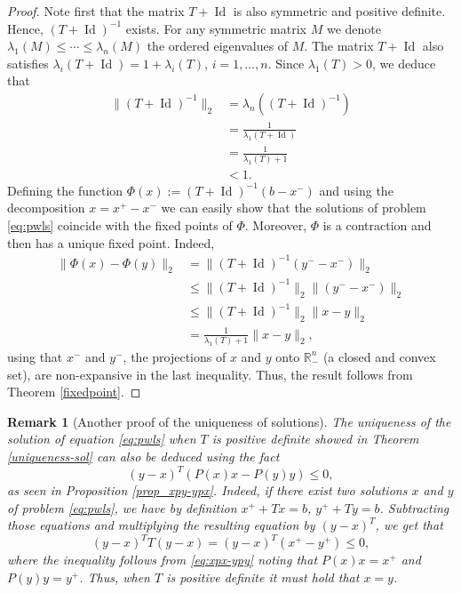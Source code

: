 \documentclass[11pt]{article}
\newtheorem{remark}{Remark}
\DeclareMathOperator{\Id}{Id}
\newcommand{\R}{\mathbb R}
\begin{document}
\begin{proof}

Note first that the matrix $T + {\Id}$ is also symmetric and positive definite. Hence, $(T + {\Id})^{-1}$ exists. For any symmetric matrix $M$ we denote $\lambda_1(M) \leq \cdots \leq \lambda_n(M)$ the ordered eigenvalues of $M$. The matrix $T + {\Id}$ also satisfies $\lambda_i(T + {\Id}) = 1 + \lambda_i(T)$, $i=1,\dots,n$.
Since $\lambda_{1}(T)> 0$, we deduce that
\begin{align*}
\|(T + {\Id})^{-1}\|_2 &= \lambda_{n}((T + {\Id})^{-1}) \\
&= \frac{1}{\lambda_{1}(T + {\Id})} \\
&= \frac{1}{\lambda_{1}(T) + 1} \\
&< 1.
\end{align*} Defining the function $\Phi(x) := (T + {\Id})^{-1}(b-x^-)$ and using the decomposition $x = x^+ - x^-$ we can easily show that the solutions of problem \eqref{eq:pwls} coincide with the fixed points of $\Phi$. Moreover, $\Phi$ is a contraction and then has a unique fixed point. Indeed,
\begin{align*}
\| \Phi(x) - \Phi(y) \|_2 &= \|(T + {\Id})^{-1}(y^--x^-)\|_2 \\
&\leq \|(T + {\Id})^{-1}\|_2 \|(y^--x^-)\|_2 \\
&\leq \|(T +{\Id})^{-1}\|_2 \|x-y\|_2 \\
&=\frac{1}{\lambda_{1}(T) + 1} \|x-y\|_2,
\end{align*} 
using that $x^-$ and $y^-$, the projections of $x$ and $y$ onto $\R^n_{-}$ (a closed and convex set), are non-expansive in the last inequality. Thus, the result follows from Theorem \ref{fixedpoint}.\end{proof}
\begin{remark}[Another proof of the uniqueness of solutions]
The uniqueness of the solution of equation \eqref{eq:pwls} when $T$ is positive definite showed in Theorem \ref{uniqueness-sol} can also be deduced using the fact
\begin{equation} \label{eq:xpx-ypy}
(y-x)^T (P(x)x-P(y)y) \leq 0,
\end{equation}
as seen in Proposition \ref{prop_xpy-ypx}. Indeed, if there exist two solutions $x$ and $y$ of problem \eqref{eq:pwls}, we have by definition $x^++Tx = b$, 
$y^++Ty = b$. Subtracting those equations and multiplying the resulting equation by $(y-x)^T$, we get that
$$ (y-x)^T T(y-x) = (y-x)^T (x^+-y^+) \leq 0, $$ where the inequality follows from \eqref{eq:xpx-ypy} noting that $P(x)x=x^+$ and $P(y)y=y^+$. Thus, when $T$ is positive definite it must hold that $x=y$.  
\end{remark}
\end{document}

